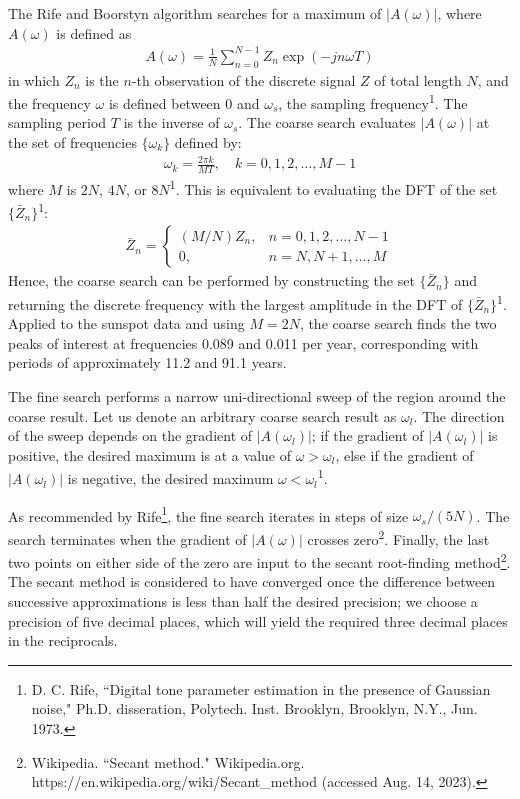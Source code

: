 \documentclass[a4paper, 11pt]{article}
\begin{document}
The Rife and Boorstyn algorithm searches for a maximum of $|A(\omega)|$, where
$A(\omega)$ is defined as
\begin{align*}
    A(\omega) = \frac{1}{N} \sum_{n=0}^{N-1} Z_n \exp(-jn\omega T)
\end{align*}
in which $Z_n$ is the $n$-th observation of the discrete signal $Z$ of total
length $N$, and the frequency $\omega$ is defined between 0 and $\omega_s$, the
sampling frequency\textsuperscript{1}. The sampling period $T$ is the inverse of
$\omega_s$. The coarse search evaluates $|A(\omega)|$ at the set of frequencies
$\{\omega_k\}$ defined by:
\begin{align*}
    \omega_k = \frac{2\pi k}{MT}, \quad k = 0,1,2,\ldots,M-1
\end{align*}
where $M$ is $2N$, $4N$, or $8N$\textsuperscript{1}. This is equivalent to
evaluating the DFT of the set $\{\bar{Z}_n\}$\textsuperscript{1}:
\begin{align*}
    \bar{Z}_n = \begin{cases}
        (M/N)Z_n, & n = 0,1,2,\ldots,N-1 \\
        0,        & n = N,N+1,\ldots,M
    \end{cases}
\end{align*}
Hence, the coarse search can be performed by constructing the set
$\{\bar{Z}_n\}$ and returning the discrete frequency with the largest amplitude
in the DFT of $\{\bar{Z}_n\}$\textsuperscript{1}. Applied to the sunspot data
and using $M=2N$, the coarse search finds the two peaks of interest at
frequencies 0.089 and 0.011 per year, corresponding with periods of
approximately 11.2 and 91.1 years.

The fine search performs a narrow uni-directional sweep of the region around the
coarse result. Let us denote an arbitrary coarse search result as $\omega_l$.
The direction of the sweep depends on the gradient of $|A(\omega_l)|$; if the
gradient of $|A(\omega_l)|$ is positive, the desired maximum is at a value of
$\omega>\omega_l$, else if the gradient of $|A(\omega_l)|$ is negative, the
desired maximum $\omega<\omega_l$\textsuperscript{1}.

As recommended by Rife\footnote{D. C. Rife, ``Digital tone parameter estimation
in the presence of Gaussian noise," Ph.D. disseration, Polytech. Inst. Brooklyn,
Brooklyn, N.Y., Jun. 1973.}, the fine search iterates in steps of size
$\omega_s/(5N)$. The search terminates when the gradient of $|A(\omega)|$
crosses zero\textsuperscript{2}. Finally, the last two points on either side of
the zero are input to the secant root-finding method\footnote{Wikipedia.
``Secant method." Wikipedia.org. https://en.wikipedia.org/wiki/Secant\_method
(accessed Aug. 14, 2023).}. The secant method is considered to have converged
once the difference between successive approximations is less than half the
desired precision; we choose a precision of five decimal places, which will
yield the required three decimal places in the reciprocals.
\end{document}
